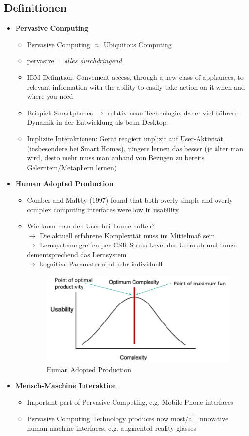 \subsection{Definitionen}
\begin{itemize}
	\item \textbf{Pervasive Computing}
	\begin{itemize}
		\item Pervasive Computing $\approx$ Ubiquitous Computing
		\item pervasive = \textit{alles durchdringend}
		\item IBM-Definition: \glqq Convenient access, through a new class of appliances, to relevant information with the ability to easily take action on it when and where you need\grqq
		\item Beispiel: Smartphones $\rightarrow$ relativ neue Technologie, daher viel höhrere Dynamik in der Entwicklung als beim Desktop. 
		\item Implizite Interaktionen: Gerät reagiert implizit auf User-Aktivität (insbesondere bei Smart Homes), jüngere lernen das besser (je älter man wird, desto mehr muss man anhand von Bezügen zu bereits Gelerntem/Metaphern lernen)
	\end{itemize}
	\item \textbf{Human Adopted Production}
	\begin{itemize}
		\item Comber and Maltby (1997) found that both overly simple and overly complex computing interfaces were low in usability 
		\item Wie kann man den User \glqq bei Laune halten\grqq ?\\
	 	$\rightarrow$ Die aktuell erfahrene Komplexität muss im Mittelmaß sein\\
	 	$\rightarrow$ Lernsysteme greifen per GSR Stress Level des Users ab und tunen dementsprechend das Lernsystem\\
	 	$\rightarrow$ kognitive Paramater sind sehr individuell
		\begin{figure}[h!]
			\centering
			\includegraphics[width=.4\textwidth]{img/ch01_HAP.png}
			\caption{Human Adopted Production}
			\label{HAP}
		\end{figure} 
	\end{itemize}
	\item \textbf{Mensch-Maschine Interaktion}
	\begin{itemize}
		\item Important part of Pervasive Computing, e.g. Mobile Phone interfaces
		\item Pervasive Computing Technology produces now most/all innovative human machine interfaces, e.g. augmented reality glasses
	\end{itemize}
\end{itemize}
